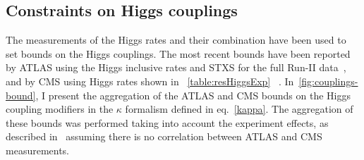 \subsection{Constraints on Higgs couplings}
The measurements of the Higgs rates and their combination have been used to set bounds on the Higgs couplings. The most recent bounds have been reported by ATLAS using the Higgs inclusive rates and STXS for the full Run-II data~\cite{ATLAS2021vrm}, and by CMS using Higgs rates shown in ~\autoref{table:resHiggsExp} ~\cite{CMS:2020gsy}. In~\autoref{fig:couplings-bound}, I present the aggregation of the ATLAS and CMS bounds on the Higgs coupling modifiers in the $\kappa$ formalism defined in eq.~\eqref{kappa}. The aggregation of these bounds was performed
taking into account the experiment effects, as described in~\cite{30688c22e51b409197a8639f2a496516} assuming there is no correlation between ATLAS and CMS measurements.  
